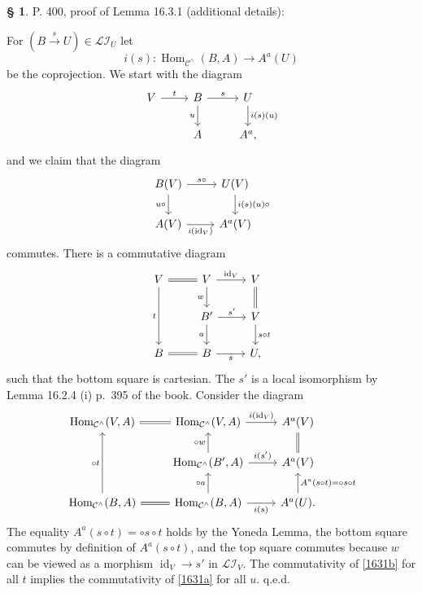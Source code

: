 \documentclass[12pt]{article}
\theoremstyle{remark}
\theoremstyle{definition}
\newtheorem{s}[thm]{\S}
\newcommand{\mc}{\mathcal}
\newcommand{\C}{\mathcal C}
\newcommand{\xr}{\xrightarrow}
\DeclareMathOperator{\id}{id}
\DeclareMathOperator{\Hom}{Hom}%
\begin{document}
\begin{s} 
P. 400, proof of Lemma 16.3.1 (additional details): 

For $(B\xr s U)\in\mc{LI}_U$ let 
$$
i(s):\Hom_{\C^\wedge}(B,A)\to A^a(U)
$$ 
be the coprojection. We start with the diagram 
$$
\begin{tikzcd}
%
V\ar{r}{t}&B\ar{d}[swap]{u}\ar{r}{s}&U\ar{d}{i(s)(u)}\\ 
{}&A&A^a,
%
\end{tikzcd}
$$ 
and we claim that the diagram 
\begin{equation}\label{1631a}
\begin{tikzcd}
%
B(V)\ar{d}[swap]{u\circ}\ar{r}{s\circ}&U(V)\ar{d}{i(s)(u)\circ}\\ 
A(V)\ar{r}[swap]{i(\id_V)}&A^a(V)
%
\end{tikzcd}
\end{equation} 
commutes. There is a commutative diagram 
$$
\begin{tikzcd}
%
V\ar{dd}[swap]{t}\ar[equal]{r}&V\ar{d}[swap]{w}\ar{r}{\id_V}&V\ar[equal]{d}\\ 
{}&B'\ar{d}[swap]{a}\ar{r}{s'}&V\ar{d}{s\circ t}\\ 
B\ar[equal]{r}&B\ar{r}[swap]{s}&U,
%
\end{tikzcd}
$$ 
such that the bottom square is cartesian. The $s'$ is a local isomorphism by Lemma 16.2.4 (i) p.~395 of the book. Consider the diagram 
%
\begin{equation}\label{1631b}
\begin{tikzcd}
\Hom_{\C^\wedge}(V,A)\ar[equal]{r}&\Hom_{\C^\wedge}(V,A)\ar{r}{i(\id_V)}&A^a(V)\ar[equal]{d}\\ 
{}&\Hom_{\C^\wedge}(B',A)\ar{u}{\circ w}\ar{r}{i(s')}&A^a(V)\\ 
\Hom_{\C^\wedge}(B,A)\ar{uu}{\circ t}\ar[equal]{r}&\Hom_{\C^\wedge}(B,A)\ar{u}{\circ a}\ar{r}[swap]{i(s)}&A^a(U)\ar{u}[swap]{A^a(s\circ t)=\circ s\circ t}.
\end{tikzcd}
\end{equation}
%
The equality $A^a(s\circ t)=\circ s\circ t$ holds by the Yoneda Lemma, the bottom square commutes by definition of $A^a(s\circ t)$, and the top square commutes because $w$ can be viewed as a morphism $\id_V\to s'$ in $\mc{LI}_V$. The commutativity of \eqref{1631b} for all $t$ implies the commutativity of \eqref{1631a} for all $u$. q.e.d.
\end{s}
%
%
\end{document}
